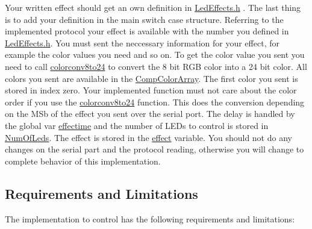 Your written effect should get an own definition in \hyperlink{_led_effects_8h}{Led\+Effects.\+h} . The last thing is to add your definition in the main switch case structure. Referring to the implemented protocol your effect is available with the number you defined in \hyperlink{_led_effects_8h}{Led\+Effects.\+h}. You must sent the neccessary information for your effect, for example the color values you need and so on. To get the color value you sent you need to call \hyperlink{_led_effects_8h_a55291315ab0f2ca8d508f0e9da1920a7}{colorconv8to24} to convert the 8 bit R\+G\+B color into a 24 bit color. All colors you sent are available in the \hyperlink{globals_8h_a159854edb9d0c7283013495d85bdf997}{Comp\+Color\+Array}. The first color you sent is stored in index zero. Your implemented function must not care about the color order if you use the \hyperlink{_led_effects_8h_a55291315ab0f2ca8d508f0e9da1920a7}{colorconv8to24} function. This does the conversion depending on the M\+Sb of the effect you sent over the serial port. The delay is handled by the global var \hyperlink{globals_8h_ac2445d316b2972d381edeac44bb6a226}{effectime} and the number of L\+E\+Ds to control is stored in \hyperlink{globals_8h_ad5db4045aed262ed4aae2af9d81fab98}{Num\+Of\+Leds}. The effect is stored in the \hyperlink{globals_8h_a053b8e1f039c19251b90d60317db8aed}{effect} variable. You should not do any changes on the serial part and the protocol reading, otherwise you will change to complete behavior of this implementation.\hypertarget{index_limitations_sec}{}\subsection{Requirements and Limitations}\label{index_limitations_sec}
The implementation to control has the following requirements and limitations\+: 
